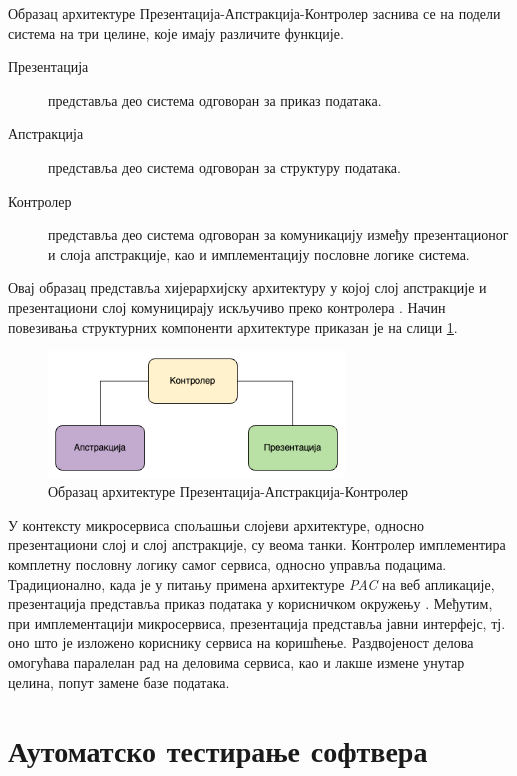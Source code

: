 \documentclass[12pt,oneside]{memoir}
\begin{document}
Образац архитектуре Презентација-Апстракција-Контролер заснива се на подели система на три целине, које имају различите функције.
\begin{description}
\item[Презентација]представља део система одговоран за приказ података.
\item[Апстракција]представља део система одговоран за структуру података.
\item[Контролер]представља део система одговоран за комуникацију између презентационог и слоја апстракције, као и имплементацију пословне логике система.
\end{description}

Овај образац представља хијерархијску архитектуру у којој слој апстракције и презентациони слој комуницирају искључиво преко контролера \cite{pac}. Начин повезивања структурних компоненти архитектуре приказан је на слици \ref{fig:pac}.

\begin{figure}[!ht]
  \centering
  \includegraphics[width=0.7\textwidth]{matfmaster/img/PAC.png}
  \caption{Образац архитектуре Презентација-Апстракција-Контролер}
  \label{fig:pac}
\end{figure}

У контексту микросервиса спољашњи слојеви архитектуре, односно презентациони слој и слој апстракције, су веома танки. Контролер имплементира комплетну пословну логику самог сервиса, односно управља подацима. Традиционално, када је у питању примена архитектуре \textit{PAC} на веб апликације, презентација представља приказ података у корисничком окружењу \cite{pac}. Међутим, при имплементацији микросервиса, презентација представља јавни интерфејс, тј. оно што је изложено кориснику сервиса на коришћење. Раздвојеност делова омогућава паралелан рад на деловима сервиса, као и лакше измене унутар целина, попут замене базе података. 



\chapter{Аутоматско тестирање софтвера}
\label{chp:testiranje}
\end{document}
